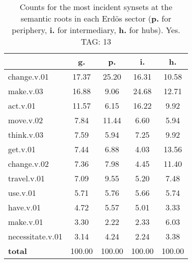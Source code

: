 \begin{table}[h!]
\begin{center}
\begin{tabular}{| l || c | c | c | c |}\hline
 & {\bf g.} & {\bf p.} & {\bf i.} & {\bf h.} \\\hline\hline
change.v.01 & 17.37  & 25.20  & 16.31  & 10.58 \\\hline
make.v.03 & 16.88  & 9.06  & 24.68  & 12.71 \\\hline
act.v.01 & 11.57  & 6.15  & 16.22  & 9.92 \\\hline
move.v.02 & 7.84  & 11.44  & 6.60  & 5.94 \\\hline
think.v.03 & 7.59  & 5.94  & 7.25  & 9.92 \\\hline
get.v.01 & 7.44  & 6.88  & 4.03  & 13.56 \\\hline
change.v.02 & 7.36  & 7.98  & 4.45  & 11.40 \\\hline
travel.v.01 & 7.09  & 9.55  & 5.20  & 7.48 \\\hline
use.v.01 & 5.71  & 5.76  & 5.66  & 5.74 \\\hline
have.v.01 & 4.72  & 5.57  & 5.01  & 3.33 \\\hline
make.v.01 & 3.30  & 2.22  & 2.33  & 6.03 \\\hline
necessitate.v.01 & 3.14  & 4.24  & 2.24  & 3.38 \\\hline\hline
{{\bf total}} & 100.00  & 100.00  & 100.00  & 100.00 \\\hline
\end{tabular}
\caption{Counts for the most incident synsets at the semantic roots in each Erd\"os sector ({\bf p.} for periphery, {\bf i.} for intermediary, {\bf h.} for hubs). Yes. TAG: 13}
\end{center}
\end{table}